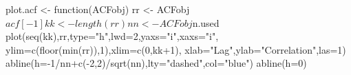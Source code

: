 \begin{Schunk}
\begin{Sinput}
 plot.acf <- function(ACFobj) {
   rr <- ACFobj$acf[-1]
   kk <- length(rr)
   nn <- ACFobj$n.used
   plot(seq(kk),rr,type="h",lwd=2,yaxs="i",xaxs="i",
        ylim=c(floor(min(rr)),1),xlim=c(0,kk+1),
        xlab="Lag",ylab="Correlation",las=1)
   abline(h=-1/nn+c(-2,2)/sqrt(nn),lty="dashed",col="blue")
   abline(h=0)
 }                                                                                                            
\end{Sinput}
\end{Schunk}
